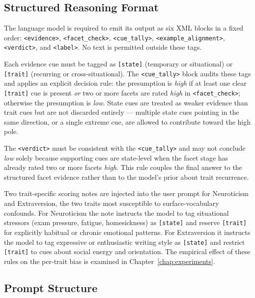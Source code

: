 \documentclass[../main.tex]{subfiles}
\begin{document}
\subsection{Structured Reasoning Format}
\label{subsec:reasoning-format}

The language model is required to emit its output as six XML blocks in a fixed
order: \texttt{<evidence>}, \texttt{<facet\_check>}, \texttt{<cue\_tally>},
\texttt{<ex\-am\-ple\_a\-lign\-ment>}, \texttt{<verdict>}, and \texttt{<label>}.
No text is permitted outside these tags.

Each evidence cue must be tagged as \texttt{[state]} (temporary or situational)
or \texttt{[trait]} (recurring or cross-situational). The \texttt{<cue\_tally>}
block audits these tags and applies an explicit decision rule: the presumption
is \textit{high} if at least one clear \texttt{[trait]} cue is present \emph{or}
two or more facets are rated \textit{high} in \texttt{<facet\_check>}; otherwise
the presumption is \textit{low}. State cues are treated as weaker evidence than
trait cues but are not discarded entirely --- multiple state cues pointing in the
same direction, or a single extreme cue, are allowed to contribute toward the
high pole.

The \texttt{<verdict>} must be consistent with the \texttt{<cue\_tally>} and
may not conclude \textit{low} solely because supporting cues are state-level
when the facet stage has already rated two or more facets \textit{high}. This
rule couples the final answer to the structured facet evidence rather than to
the model's prior about trait recurrence.

Two trait-specific scoring notes are injected into the user prompt for
Neuroticism and Extraversion, the two traits most susceptible to
surface-vocabulary confounds. For Neuroticism the note instructs the model to
tag situational stressors (exam pressure, fatigue, homesickness) as
\texttt{[state]} and reserve \texttt{[trait]} for explicitly habitual or
chronic emotional patterns. For Extraversion it instructs the model to tag
expressive or enthusiastic writing style as \texttt{[state]} and restrict
\texttt{[trait]} to cues about social energy and orientation. The empirical
effect of these rules on the per-trait bias is examined in
Chapter~\ref{chap:experiments}.

\subsection{Prompt Structure}
\end{document}
